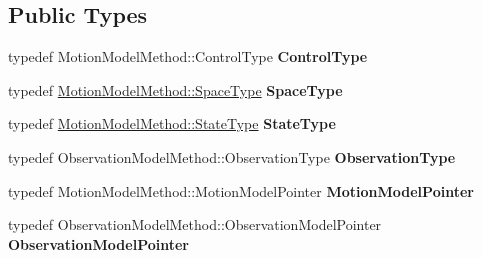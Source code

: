 \subsection*{\-Public \-Types}
\begin{DoxyCompactItemize}
\item 
\hypertarget{class_linearized_k_f_a7c538be0fa27f880c2272d6b1fbe8729}{typedef \*
\-Motion\-Model\-Method\-::\-Control\-Type {\bfseries \-Control\-Type}}\label{class_linearized_k_f_a7c538be0fa27f880c2272d6b1fbe8729}

\item 
\hypertarget{class_linearized_k_f_a068ecc6782388590cba62370670585d1}{typedef \*
\hyperlink{class_s_e2_belief_space}{\-Motion\-Model\-Method\-::\-Space\-Type} {\bfseries \-Space\-Type}}\label{class_linearized_k_f_a068ecc6782388590cba62370670585d1}

\item 
\hypertarget{class_linearized_k_f_aab4a87264c8e70b665298697e4a49a02}{typedef \*
\hyperlink{class_s_e2_belief_space_1_1_state_type}{\-Motion\-Model\-Method\-::\-State\-Type} {\bfseries \-State\-Type}}\label{class_linearized_k_f_aab4a87264c8e70b665298697e4a49a02}

\item 
\hypertarget{class_linearized_k_f_a66feb5ecffc79354460e8bd3d431ff12}{typedef \*
\-Observation\-Model\-Method\-::\-Observation\-Type {\bfseries \-Observation\-Type}}\label{class_linearized_k_f_a66feb5ecffc79354460e8bd3d431ff12}

\item 
\hypertarget{class_linearized_k_f_a2673ebedf419ec686789f03d94c3307f}{typedef \*
\-Motion\-Model\-Method\-::\-Motion\-Model\-Pointer {\bfseries \-Motion\-Model\-Pointer}}\label{class_linearized_k_f_a2673ebedf419ec686789f03d94c3307f}

\item 
\hypertarget{class_linearized_k_f_a885fd5b62c570da6e5eaf1f1fc33d542}{typedef \*
\-Observation\-Model\-Method\-::\-Observation\-Model\-Pointer {\bfseries \-Observation\-Model\-Pointer}}\label{class_linearized_k_f_a885fd5b62c570da6e5eaf1f1fc33d542}

\end{DoxyCompactItemize}
